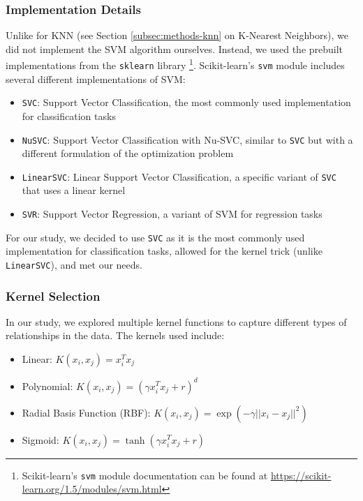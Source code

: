 \subsubsection{Implementation Details}

Unlike for KNN (see Section \ref{subsec:methods-knn} on K-Nearest Neighbors), we did not implement the SVM algorithm ourselves.
Instead, we used the prebuilt implementations from the \texttt{sklearn} library
\footnote{Scikit-learn's \texttt{svm} module documentation can be found at \url{https://scikit-learn.org/1.5/modules/svm.html}}.
Scikit-learn's \texttt{svm} module includes several different implementations of SVM:

\begin{itemize}
    \item \texttt{SVC}: Support Vector Classification, the most commonly used implementation for classification tasks
    \item \texttt{NuSVC}: Support Vector Classification with Nu-SVC, similar to \texttt{SVC} but with a different formulation of the optimization problem 
    \item \texttt{LinearSVC}: Linear Support Vector Classification, a specific variant of \texttt{SVC} that uses a linear kernel
    \item \texttt{SVR}: Support Vector Regression, a variant of SVM for regression tasks
\end{itemize}

For our study, we decided to use \texttt{SVC} as it is the most commonly used implementation
for classification tasks, allowed for the kernel trick (unlike \texttt{LinearSVC}), and met our needs.

\subsubsection{Kernel Selection}

In our study, we explored multiple kernel functions to capture different types of relationships in the data. The kernels used include:

\begin{itemize}
    \item Linear: $K(x_i, x_j) = x_i^T x_j$
    \item Polynomial: $K(x_i, x_j) = (\gamma x_i^T x_j + r)^d$
    \item Radial Basis Function (RBF): $K(x_i, x_j) = \exp(-\gamma ||x_i - x_j||^2)$
    \item Sigmoid: $K(x_i, x_j) = \tanh(\gamma x_i^T x_j + r)$
\end{itemize}

